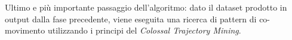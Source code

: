 Ultimo e più importante passaggio dell'algoritmo: dato il dataset prodotto in output dalla fase precedente,
viene eseguita una ricerca di pattern di co-movimento utilizzando i principi del \textit{Colossal Trajectory Mining}.



